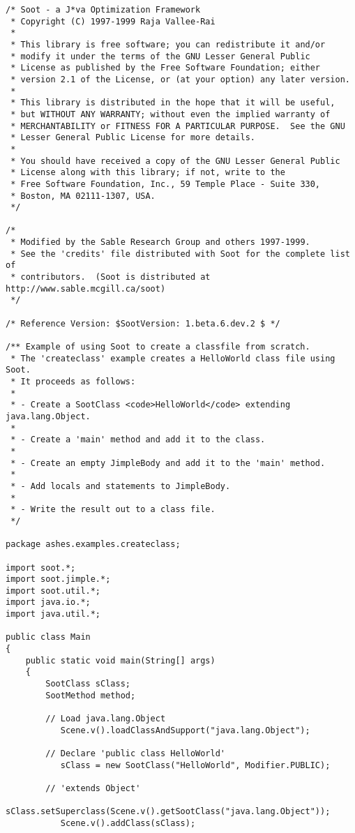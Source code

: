 \documentclass{article}
\begin{document}
\begin{verbatim}
/* Soot - a J*va Optimization Framework
 * Copyright (C) 1997-1999 Raja Vallee-Rai
 *
 * This library is free software; you can redistribute it and/or
 * modify it under the terms of the GNU Lesser General Public
 * License as published by the Free Software Foundation; either
 * version 2.1 of the License, or (at your option) any later version.
 *
 * This library is distributed in the hope that it will be useful,
 * but WITHOUT ANY WARRANTY; without even the implied warranty of
 * MERCHANTABILITY or FITNESS FOR A PARTICULAR PURPOSE.  See the GNU
 * Lesser General Public License for more details.
 *
 * You should have received a copy of the GNU Lesser General Public
 * License along with this library; if not, write to the
 * Free Software Foundation, Inc., 59 Temple Place - Suite 330,
 * Boston, MA 02111-1307, USA.
 */

/*
 * Modified by the Sable Research Group and others 1997-1999.  
 * See the 'credits' file distributed with Soot for the complete list of
 * contributors.  (Soot is distributed at http://www.sable.mcgill.ca/soot)
 */

/* Reference Version: $SootVersion: 1.beta.6.dev.2 $ */

/** Example of using Soot to create a classfile from scratch.
 * The 'createclass' example creates a HelloWorld class file using Soot.
 * It proceeds as follows:
 *
 * - Create a SootClass <code>HelloWorld</code> extending java.lang.Object.
 *
 * - Create a 'main' method and add it to the class.
 *
 * - Create an empty JimpleBody and add it to the 'main' method.
 *
 * - Add locals and statements to JimpleBody.
 *
 * - Write the result out to a class file.
 */

package ashes.examples.createclass;

import soot.*;
import soot.jimple.*;
import soot.util.*;
import java.io.*;
import java.util.*;

public class Main
{
    public static void main(String[] args)
    {
        SootClass sClass;
        SootMethod method;
        
        // Load java.lang.Object
           Scene.v().loadClassAndSupport("java.lang.Object");
           
        // Declare 'public class HelloWorld'   
           sClass = new SootClass("HelloWorld", Modifier.PUBLIC);
        
        // 'extends Object'
           sClass.setSuperclass(Scene.v().getSootClass("java.lang.Object"));
           Scene.v().addClass(sClass);
           

\end{verbatim}
\end{document}
